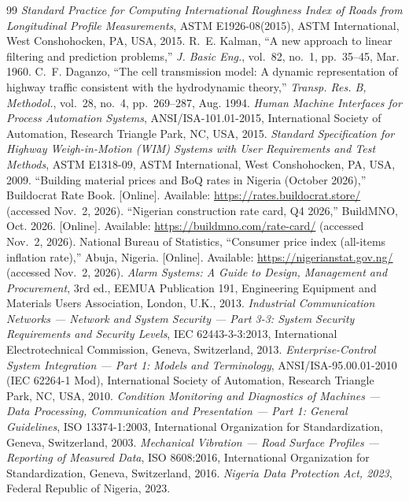 \documentclass[11pt,a4paper]{article}
\begin{document}
\begin{thebibliography}{99}
 \emph{Standard Practice for Computing International Roughness Index of Roads from Longitudinal Profile Measurements}, ASTM E1926-08(2015), ASTM International, West Conshohocken, PA, USA, 2015.
 R.~E. Kalman, ``A new approach to linear filtering and prediction problems,'' \emph{J. Basic Eng.}, vol.~82, no.~1, pp.~35--45, Mar. 1960.
 C.~F. Daganzo, ``The cell transmission model: A dynamic representation of highway traffic consistent with the hydrodynamic theory,'' \emph{Transp. Res. B, Methodol.}, vol.~28, no.~4, pp.~269--287, Aug. 1994.
 \emph{Human Machine Interfaces for Process Automation Systems}, ANSI/ISA-101.01-2015, International Society of Automation, Research Triangle Park, NC, USA, 2015.
 \emph{Standard Specification for Highway Weigh-in-Motion (WIM) Systems with User Requirements and Test Methods}, ASTM E1318-09, ASTM International, West Conshohocken, PA, USA, 2009.
 ``Building material prices and BoQ rates in Nigeria (October 2026),'' Buildocrat Rate Book. [Online]. Available: \url{https://rates.buildocrat.store/} (accessed Nov.~2, 2026).
 ``Nigerian construction rate card, Q4 2026,'' BuildMNO, Oct. 2026. [Online]. Available: \url{https://buildmno.com/rate-card/} (accessed Nov.~2, 2026).
 National Bureau of Statistics, ``Consumer price index (all-items inflation rate),'' Abuja, Nigeria. [Online]. Available: \url{https://nigerianstat.gov.ng/} (accessed Nov.~2, 2026).
 \emph{Alarm Systems: A Guide to Design, Management and Procurement}, 3rd ed., EEMUA Publication 191, Engineering Equipment and Materials Users Association, London, U.K., 2013.
 \emph{Industrial Communication Networks --- Network and System Security --- Part 3-3: System Security Requirements and Security Levels}, IEC 62443-3-3:2013, International Electrotechnical Commission, Geneva, Switzerland, 2013.
 \emph{Enterprise-Control System Integration --- Part 1: Models and Terminology}, ANSI/ISA-95.00.01-2010 (IEC 62264-1 Mod), International Society of Automation, Research Triangle Park, NC, USA, 2010.
 \emph{Condition Monitoring and Diagnostics of Machines --- Data Processing, Communication and Presentation --- Part 1: General Guidelines}, ISO 13374-1:2003, International Organization for Standardization, Geneva, Switzerland, 2003.
 \emph{Mechanical Vibration --- Road Surface Profiles --- Reporting of Measured Data}, ISO 8608:2016, International Organization for Standardization, Geneva, Switzerland, 2016.
 \emph{Nigeria Data Protection Act, 2023}, Federal Republic of Nigeria, 2023.
\end{thebibliography}
\end{document}
